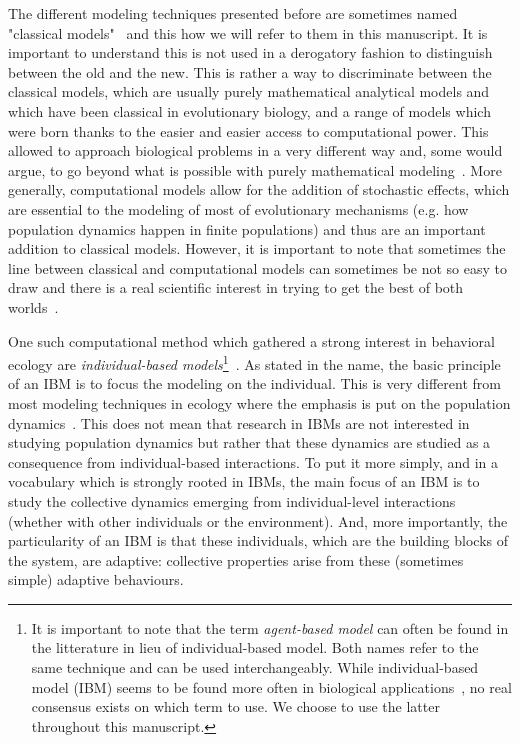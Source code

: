     The different modeling techniques presented before are sometimes named "classical models"~\cite{DeAngelis2005, Adami2014} and this how we will refer to them in this manuscript. It is important to understand this is not used in a derogatory fashion to distinguish between the old and the new. This is rather a way to discriminate between the classical models, which are usually purely mathematical analytical models and which have been classical in evolutionary biology, and a range of models which were born thanks to the easier and easier access to computational power. This allowed to approach biological problems in a very different way and, some would argue, to go beyond what is possible with purely mathematical modeling~\cite{Adami2012}. More generally, computational models allow for the addition of stochastic effects, which are essential to the modeling of most of evolutionary mechanisms (e.g. how population dynamics happen in finite populations) and thus are an important addition to classical models. However, it is important to note that sometimes the line between classical and computational models can sometimes be not so easy to draw and there is a real scientific interest in trying to get the best of both worlds~\cite{Wilson1998}.

    One such computational method which gathered a strong interest in behavioral ecology are \emph{individual-based models}\footnote{It is important to note that the term \emph{agent-based model} can often be found in the litterature in lieu of individual-based model. Both names refer to the same technique and can be used interchangeably. While individual-based model (IBM) seems to be found more often in biological applications~\cite{Grimm2005}, no real consensus exists on which term to use. We choose to use the latter throughout this manuscript.}~\cite{Huston1988}. As stated in the name, the basic principle of an IBM is to focus the modeling on the individual. This is very different from most modeling techniques in ecology where the emphasis is put on the population dynamics~\cite{Grimm2005}. This does not mean that research in IBMs are not interested in studying population dynamics but rather that these dynamics are studied as a consequence from individual-based interactions. To put it more simply, and in a vocabulary which is strongly rooted in IBMs, the main focus of an IBM is to study the collective dynamics emerging from individual-level interactions (whether with other individuals or the environment). And, more importantly, the particularity of an IBM is that these individuals, which are the building blocks of the system, are adaptive: collective properties arise from these (sometimes simple) adaptive behaviours.

